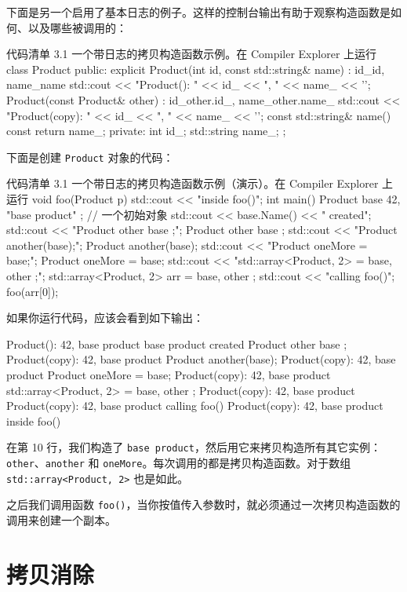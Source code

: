 下面是另一个启用了基本日志的例子。这样的控制台输出有助于观察构造函数是如何、以及哪些被调用的：

\begin{codeboxt}[cpp]{代码清单 3.1 一个带日志的拷贝构造函数示例。在 Compiler Explorer 上运行}
class Product {
public:
explicit Product(int id, const std::string& name)
: id_{id}, name_{name} {
std::cout << "Product(): " << id_ << ", " << name_ << '\n';
}
Product(const Product& other)
: id_{other.id_}, name_{other.name_}
{
std::cout << "Product(copy): " << id_ << ", " << name_ << '\n';
}
const std::string& name() const { return name_; }
private:
int id_;
std::string name_;
};
\end{codeboxt}

下面是创建 \texttt{Product} 对象的代码：

\begin{codeboxt}[cpp]{代码清单 3.1 一个带日志的拷贝构造函数示例（演示）。在 Compiler Explorer 上运行}
void foo(Product p) { std::cout << "inside foo()\n"; }
int main() {
Product base { 42, "base product" }; // 一个初始对象
std::cout << base.Name() << " created\n";
std::cout << "Product other { base };\n";
Product other { base };
std::cout << "Product another(base);\n";
Product another(base);
std::cout << "Product oneMore = base;\n";
Product oneMore = base;
std::cout << "std::array<Product, 2> = { base, other };\n";
std::array<Product, 2> arr = { base, other };
std::cout << "calling foo()\n";
foo(arr[0]);
}
\end{codeboxt}


如果你运行代码，应该会看到如下输出：

\begin{codebox}[cpp]
Product(): 42, base product
base product created
Product other { base };
Product(copy): 42, base product
Product another(base);
Product(copy): 42, base product
Product oneMore = base;
Product(copy): 42, base product
std::array<Product, 2> = { base, other };
Product(copy): 42, base product
Product(copy): 42, base product
calling foo()
Product(copy): 42, base product
inside foo()
\end{codebox}

在第 10 行，我们构造了 \texttt{base product}，然后用它来拷贝构造所有其它实例：\texttt{other}、\texttt{another} 和 \texttt{oneMore}。每次调用的都是拷贝构造函数。对于数组 \texttt{std::array<Product, 2>} 也是如此。

之后我们调用函数 \texttt{foo()}，当你按值传入参数时，就必须通过一次拷贝构造函数的调用来创建一个副本。

\section{拷贝消除}

